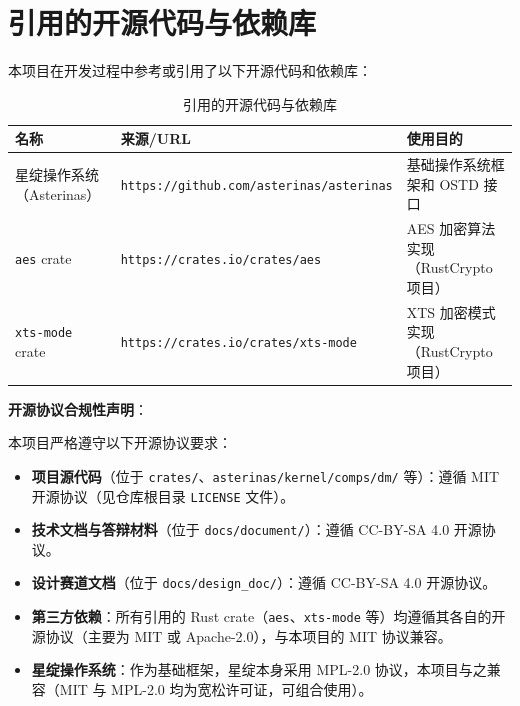 \section{引用的开源代码与依赖库}

本项目在开发过程中参考或引用了以下开源代码和依赖库：

\begin{table}[H]
    \centering
    \small
    \caption{引用的开源代码与依赖库}
    \label{tab:open_source_refs}
    \begin{tabular}{p{}p{}p{}}
        \toprule
        \textbf{名称} & \textbf{来源/URL} & \textbf{使用目的} \\
        \midrule
        星绽操作系统（Asterinas） & \texttt{https://github.com/}\newline\texttt{asterinas/asterinas} & 基础操作系统框架和 OSTD 接口 \\
        \texttt{aes} crate & \texttt{https://crates.io/}\newline\texttt{crates/aes} & AES 加密算法实现（RustCrypto 项目） \\
        \texttt{xts-mode} crate & \texttt{https://crates.io/}\newline\texttt{crates/xts-mode} & XTS 加密模式实现（RustCrypto 项目） \\
        \bottomrule
    \end{tabular}
\end{table}

\textbf{开源协议合规性声明}：

本项目严格遵守以下开源协议要求：

\begin{itemize}
    \item \textbf{项目源代码}（位于 \texttt{crates/}、\texttt{asterinas/kernel/comps/dm/} 等）：遵循 MIT 开源协议（见仓库根目录 \texttt{LICENSE} 文件）。
    \item \textbf{技术文档与答辩材料}（位于 \texttt{docs/document/}）：遵循 CC-BY-SA 4.0 开源协议。
    \item \textbf{设计赛道文档}（位于 \texttt{docs/design\_doc/}）：遵循 CC-BY-SA 4.0 开源协议。
    \item \textbf{第三方依赖}：所有引用的 Rust crate（\texttt{aes}、\texttt{xts-mode} 等）均遵循其各自的开源协议（主要为 MIT 或 Apache-2.0），与本项目的 MIT 协议兼容。
    \item \textbf{星绽操作系统}：作为基础框架，星绽本身采用 MPL-2.0 协议，本项目与之兼容（MIT 与 MPL-2.0 均为宽松许可证，可组合使用）。
\end{itemize}

